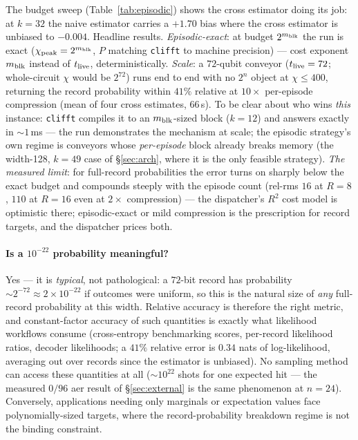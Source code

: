 \documentclass[11pt]{article}
\begin{document}
The budget sweep (Table~\ref{tab:episodic}) shows the cross estimator doing
its job: at $k{=}32$ the naive estimator carries a $+1.70$ bias where the
cross estimator is unbiased to $-0.004$. Headline results.
\emph{Episodic-exact}: at budget $2^{m_{\rm blk}}$ the run is exact
($\chi_{\rm peak}=2^{m_{\rm blk}}$, $P$ matching \texttt{clifft} to machine
precision) --- cost exponent $m_{\rm blk}$ instead of $t_{\rm live}$,
deterministically. \emph{Scale}: a $72$-qubit conveyor ($t_{\rm live}=72$;
whole-circuit $\chi$ would be $2^{72}$) runs end to end with no $2^n$ object
at $\chi\le400$, returning the record probability within $41\%$ relative at
$10\times$ per-episode compression (mean of four cross estimates, $66$\,s).
To be clear about who wins \emph{this} instance: \texttt{clifft} compiles it
to an $m_{\rm blk}$-sized block ($k{=}12$) and answers exactly in
$\sim\!1$\,ms --- the run demonstrates the mechanism at scale; the episodic
strategy's own regime is conveyors whose \emph{per-episode} block already
breaks memory (the width-128, $k{=}49$ case of \S\ref{sec:arch}, where it is
the only feasible strategy).
\emph{The measured limit}: for full-record probabilities the error turns on
sharply below the exact budget and compounds steeply with the episode count
(rel-rms $16$ at $R{=}8$, $110$ at $R{=}16$ even at $2\times$ compression) ---
the dispatcher's $R^2$ cost model is optimistic there; episodic-exact or mild
compression is the prescription for record targets, and the dispatcher prices
both.

\paragraph{Is a $10^{-22}$ probability meaningful?} Yes --- it is
\emph{typical}, not pathological: a $72$-bit record has probability
$\sim2^{-72}\approx2\times10^{-22}$ if outcomes were uniform, so this is the
natural size of \emph{any} full-record probability at this width. Relative
accuracy is therefore the right metric, and constant-factor accuracy of such
quantities is exactly what likelihood workflows consume (cross-entropy
benchmarking scores, per-record likelihood ratios, decoder likelihoods; a
$41\%$ relative error is $0.34$ nats of log-likelihood, averaging out over
records since the estimator is unbiased). No sampling method can access these
quantities at all ($\sim10^{22}$ shots for one expected hit --- the measured
$0/96$ aer result of \S\ref{sec:external} is the same phenomenon at $n{=}24$).
Conversely, applications needing only marginals or expectation values face
polynomially-sized targets, where the record-probability breakdown regime is
not the binding constraint.
\end{document}
